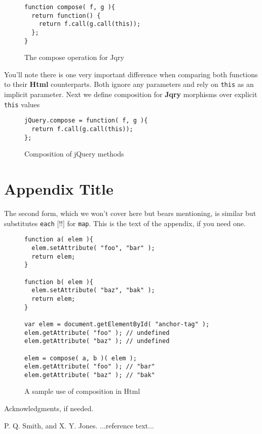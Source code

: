 \documentclass[preprint]{sigplanconf}
\begin{document}
\begin{figure}[h!]
\begin{verbatim}
function compose( f, g ){
  return function() {
    return f.call(g.call(this));
  };
}
\end{verbatim}
\nocaptionrule \caption{The compose operation for Jqry}
\end{figure}

You'll note there is one very important difference when comparing both functions to their \textbf{Html} counterparts. Both ignore any parameters and rely on \verb|this| as an implicit parameter. Next we define composition for \textbf{Jqry} morphisms over explicit \verb|this| values

\begin{figure}[h!]
\begin{verbatim}
jQuery.compose = function( f, g ){
  return f.call(g.call(this));
};
\end{verbatim}
\nocaptionrule \caption{Composition of jQuery methods}
\end{figure}


\appendix
\section{Appendix Title}

The second form, which we won't cover here but bears mentioning, is similar but substitutes \verb|each| [!!] for \verb|map|.
This is the text of the appendix, if you need one.

\begin{figure}[h!]
\begin{verbatim}
function a( elem ){
  elem.setAttribute( "foo", "bar" );
  return elem;
}

function b( elem ){
  elem.setAttribute( "baz", "bak" );
  return elem;
}

var elem = document.getElementById( "anchor-tag" );
elem.getAttribute( "foo" ); // undefined
elem.getAttribute( "baz" ); // undefined

elem = compose( a, b )( elem );
elem.getAttribute( "foo" ); // "bar"
elem.getAttribute( "baz" ); // "bak"
\end{verbatim}
\nocaptionrule \caption{A sample use of composition in Html}
\end{figure}

\acks

Acknowledgments, if needed.





\begin{thebibliography}{}
\softraggedright

P. Q. Smith, and X. Y. Jones. ...reference text...

\end{thebibliography}
\end{document}
